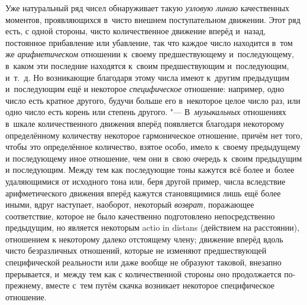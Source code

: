 Уже натуральный ряд чисел обнаруживает такую {\em узловую линию} качественных
моментов, проявляющихся в~чисто внешнем поступательном движении. Этот ряд есть,
с одной стороны, чисто количественное движение вперёд и~назад, постоянное
прибавление или убавление, так что каждое число находится в~том же
{\em арифметическом} отношении к~своему предшествующему и~последующему, в~каком
эти последние находятся к~своим предшествующим и~последующим, и~т.~д. Но
возникающие благодаря этому числа имеют к~другим предыдущим и~последующим ещё и
некоторое {\em специфическое} отношение: например, одно число есть кратное
другого, будучи больше его в~некоторое целое число раз, или одно число есть
корень или степень другого. "--- В~{\em музыкальных} отношениях в~шкале
количественного движения вперёд появляется благодаря некоторому определённому
количеству некоторое гармоническое отношение, причём нет того, чтобы это
определённое количество, взятое особо, имело к~своему предыдущему и
последующему иное отношение, чем они в~свою очередь к~своим предыдущим и
последующим. Между тем как последующие тоны кажутся всё более и~более
удаляющимися от исходного тона или, беря другой пример, числа вследствие
арифметического движения вперёд кажутся становящимися лишь ещё более иными,
вдруг наступает, наоборот, некоторый {\em возврат,} поражающее соответствие,
которое не было качественно подготовлено непосредственно предыдущим, но
является некоторым actio in distans (действием на расстоянии), отношением к
некоторому далеко отстоящему члену; движение вперёд вдоль чисто безразличных
отношений, которые не изменяют предшествующей специфической реальности или даже
вообще не образуют таковой, внезапно прерывается, и~между тем как с
количественной стороны оно продолжается по-прежнему, вместе с~тем путём скачка
возникает некоторое специфическое отношение.

